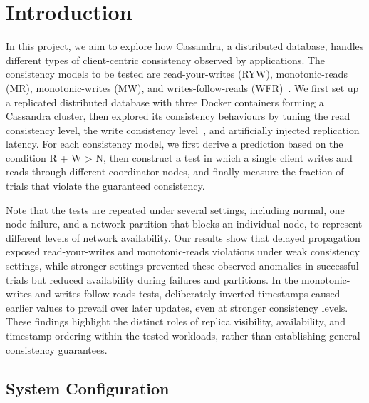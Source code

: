 \section{Introduction}\label{introduction:introduction}

In this project, we aim to explore how Cassandra, a distributed database, handles different types of client-centric consistency observed by applications. The consistency models to be tested are read-your-writes (RYW), monotonic-reads (MR), monotonic-writes (MW), and writes-follow-reads (WFR)~\cite{terry1994}. We first set up a replicated distributed database with three Docker containers forming a Cassandra cluster, then explored its consistency behaviours by tuning the read consistency level, the write consistency level~\cite{cassandra-dynamo}, and artificially injected replication latency. For each consistency model, we first derive a prediction based on the condition R + W \textgreater{} N, then construct a test in which a single client writes and reads through different coordinator nodes, and finally measure the fraction of trials that violate the guaranteed consistency.

Note that the tests are repeated under several settings, including normal, one node failure, and a network partition that blocks an individual node, to represent different levels of network availability. Our results show that delayed propagation exposed read-your-writes and monotonic-reads violations under weak consistency settings, while stronger settings prevented these observed anomalies in successful trials but reduced availability during failures and partitions. In the monotonic-writes and writes-follow-reads tests, deliberately inverted timestamps caused earlier values to prevail over later updates, even at stronger consistency levels. These findings highlight the distinct roles of replica visibility, availability, and timestamp ordering within the tested workloads, rather than establishing general consistency guarantees.

\subsection{System Configuration}\label{introduction:system-configuration}

